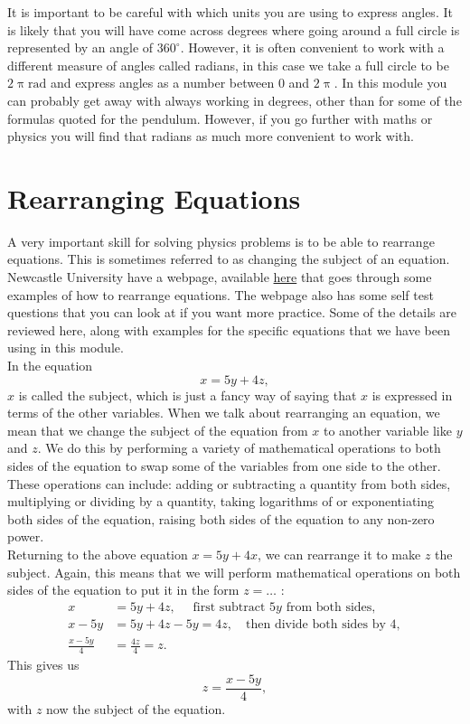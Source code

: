 \documentclass[a4paper,12pt]{book}
\begin{document}
It is important to be careful with which units you are using to express angles. It is likely that you will have come across degrees where going around a full circle is represented by an angle of $360^{\circ}$. However, it is often convenient to work with a different measure of angles called radians, in this case we take a full circle to be $2\uppi\text{rad}$ and express angles as a number between $0$ and $2\uppi$. In this module you can probably get away with always working in degrees, other than for some of the formulas quoted for the pendulum. However, if you go further with maths or physics you will find that radians as much more convenient to work with.

\section{Rearranging Equations}
A very important skill for solving physics problems is to be able to rearrange equations. This is sometimes referred to as changing the subject of an equation. Newcastle University have a webpage, available \href{https://www.mas.ncl.ac.uk/ask/numeracy-maths-statistics/core-mathematics/pure-maths/algebra/rearranging-equations.html}{here} that goes through some examples of how to rearrange equations. The webpage also has some self test questions that you can look at if you want more practice. Some of the details are reviewed here, along with examples for the specific equations that we have been using in this module.\\


In the equation
\begin{equation*}
x=5y+4z,
\end{equation*}
$x$ is called the subject, which is just a fancy way of saying that $x$ is expressed in terms of the other variables. When we talk about rearranging an equation, we mean that we change the subject of the equation from $x$ to another variable like $y$ and $z$. We do this by performing a variety of mathematical operations to both sides of the equation to swap some of the variables from one side to the other. \\

These operations can include: adding or subtracting a quantity from both sides, multiplying or dividing by a quantity, taking logarithms of or exponentiating both sides of the equation, raising both sides of the equation to any non-zero power.\\

Returning to the above equation $x=5y+4x$, we can rearrange it to make $z$ the subject. Again, this means that we will perform mathematical operations on both sides of the equation to put it in the form $z=\dots{}$ : 
\begin{align*}
x&=5y+4z, \quad \text{ first subtract $5y$ from both sides},\\
x-5y&=5y+4z-5y=4z, \quad \text{then divide both sides by 4},\\
\frac{x-5y}{4}&=\frac{4z}{4}=z.
\end{align*}
This gives us
\begin{equation*}
z=\frac{x-5y}{4},
\end{equation*}
with $z$ now the subject of the equation.\\
\end{document}
